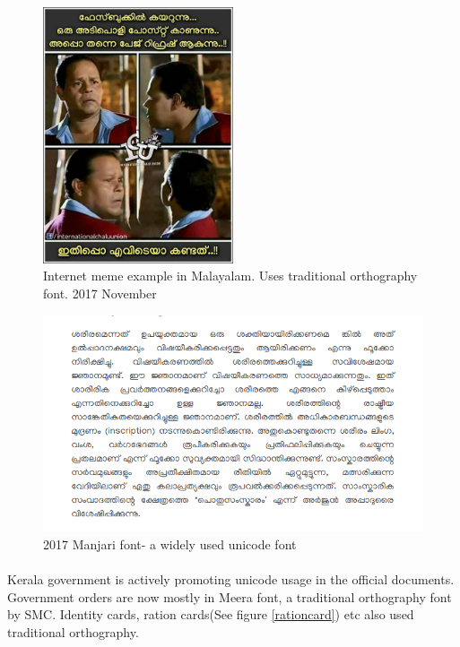 \documentclass[10pt]{article}
\begin{document}
\begin{figure}[H]
	\centering
	\includegraphics[width=0.5\textwidth]{images/2017-icu-meme.jpg}
	\caption{Internet meme example in Malayalam. Uses traditional orthography font. 2017 November}
\end{figure}


\begin{figure}[h!]
	\centering
	\includegraphics[width=1.0\textwidth]{images/Manjari-Body-Text.png}
	\caption{2017 Manjari font- a widely used unicode font}
\end{figure}


\paragraph{}
Kerala government is actively promoting unicode usage in the official documents. Government orders are now mostly in Meera font, a traditional orthography font by SMC. Identity cards, ration cards(See figure \ref{rationcard}) etc also used traditional orthography.
\end{document}
